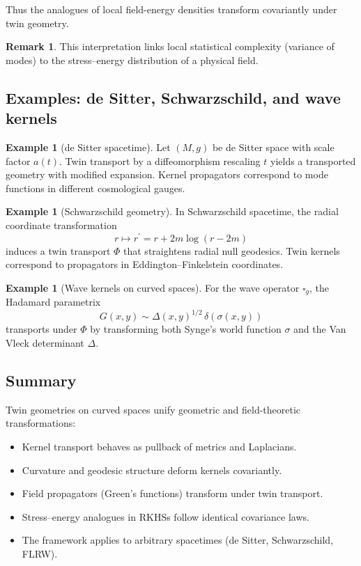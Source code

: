 \documentclass[11pt]{article}
\theoremstyle{definition}
\newtheorem{example}[theorem]{Example}
\newtheorem{remark}[theorem]{Remark}
\begin{document}
Thus the analogues of local field-energy densities transform covariantly under twin geometry.

\begin{remark}
	This interpretation links local statistical complexity (variance of modes) to the stress–energy distribution of a physical field.
\end{remark}

\subsection{Examples: de Sitter, Schwarzschild, and wave kernels}

\begin{example}[de Sitter spacetime]
	Let $(M,g)$ be de Sitter space with scale factor $a(t)$.
	Twin transport by a diffeomorphism rescaling $t$ yields a transported geometry with modified expansion.
	Kernel propagators correspond to mode functions in different cosmological gauges.
\end{example}

\begin{example}[Schwarzschild geometry]
	In Schwarzschild spacetime, the radial coordinate transformation
	\[
	r\mapsto r^\prime = r + 2m\log(r-2m)
	\]
	induces a twin transport $\Phi$ that straightens radial null geodesics.
	Twin kernels correspond to propagators in Eddington–Finkelstein coordinates.
\end{example}

\begin{example}[Wave kernels on curved spaces]
	For the wave operator $\square_g$, the Hadamard parametrix
	\[
	G(x,y) \sim \Delta(x,y)^{1/2}\,\delta(\sigma(x,y))
	\]
	transports under $\Phi$ by transforming both Synge’s world function $\sigma$ and the Van Vleck determinant $\Delta$.
\end{example}

\subsection{Summary}

Twin geometries on curved spaces unify geometric and field-theoretic transformations:
\begin{itemize}[itemsep=3pt]
	\item Kernel transport behaves as pullback of metrics and Laplacians.
	\item Curvature and geodesic structure deform kernels covariantly.
	\item Field propagators (Green’s functions) transform under twin transport.
	\item Stress–energy analogues in RKHSs follow identical covariance laws.
	\item The framework applies to arbitrary spacetimes (de Sitter, Schwarzschild, FLRW).
\end{itemize}
\end{document}
